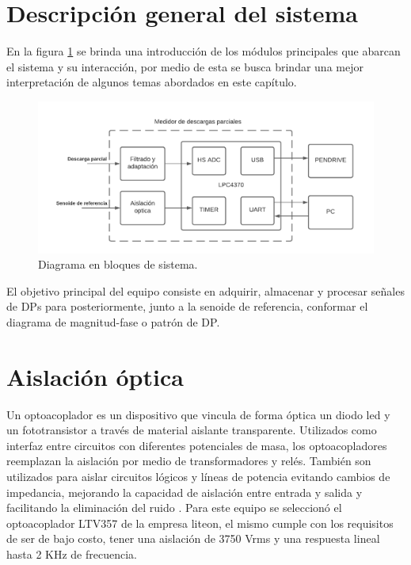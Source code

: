 \section{Descripción general del sistema}

En la figura \ref{fig:bloques} se brinda una introducción de los módulos principales que abarcan el sistema y su interacción, por medio de esta se busca brindar una mejor interpretación de algunos temas abordados en este capítulo.

\begin{figure}[ht]
	\centering
	\includegraphics[width=\textwidth]{./Figures/bloques.png}
	\caption{Diagrama en bloques de sistema.}
	\label{fig:bloques}
\end{figure}

El objetivo principal del equipo consiste en adquirir, almacenar y procesar señales de DPs para posteriormente, junto a la senoide de referencia, conformar el diagrama de magnitud-fase o patrón de DP.

\section{Aislación óptica}
Un optoacoplador es un dispositivo que vincula de forma óptica un diodo led y un fototransistor a través  de material aislante transparente. Utilizados como interfaz entre circuitos con diferentes potenciales de masa, los optoacopladores reemplazan la aislación por medio de transformadores y relés. También son utilizados para aislar circuitos lógicos y líneas de potencia evitando cambios de impedancia, mejorando la capacidad de aislación entre entrada y salida y facilitando la eliminación del ruido \citep{opto:appnote}. Para este equipo se seleccionó el optoacoplador LTV357 \citep{opto:ltv357} de la empresa liteon, el mismo cumple con los requisitos de ser de bajo costo, tener una aislación de 3750 Vrms y una respuesta lineal hasta 2 KHz de frecuencia.

